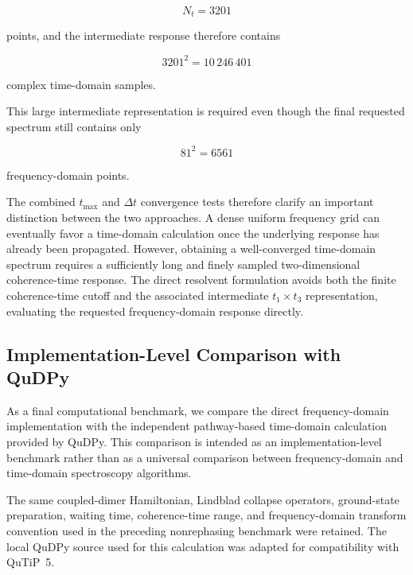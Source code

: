 \documentclass[11pt]{article}
\begin{document}
\begin{equation}
N_t=3201
\end{equation}

points, and the intermediate response therefore contains

\begin{equation}
\boxed{
3201^2
=
10\,246\,401
}
\end{equation}

complex time-domain samples.

This large intermediate representation is required even though the
final requested spectrum still contains only

\begin{equation}
81^2
=
6561
\end{equation}

frequency-domain points.

The combined $t_{\max}$ and $\Delta t$ convergence tests therefore
clarify an important distinction between the two approaches.  A dense
uniform frequency grid can eventually favor a time-domain calculation
once the underlying response has already been propagated.  However,
obtaining a well-converged time-domain spectrum requires a sufficiently
long and finely sampled two-dimensional coherence-time response.  The
direct resolvent formulation avoids both the finite coherence-time
cutoff and the associated intermediate $t_1\times t_3$ representation,
evaluating the requested frequency-domain response directly.

\subsection{Implementation-Level Comparison with QuDPy}
\label{subsec:qudpy_performance}

As a final computational benchmark, we compare the direct
frequency-domain implementation with the independent pathway-based
time-domain calculation provided by QuDPy.  This comparison is
intended as an implementation-level benchmark rather than as a
universal comparison between frequency-domain and time-domain
spectroscopy algorithms.

The same coupled-dimer Hamiltonian, Lindblad collapse operators,
ground-state preparation, waiting time, coherence-time range, and
frequency-domain transform convention used in the preceding
nonrephasing benchmark were retained.  The local QuDPy source used for
this calculation was adapted for compatibility with QuTiP~5.
\end{document}
